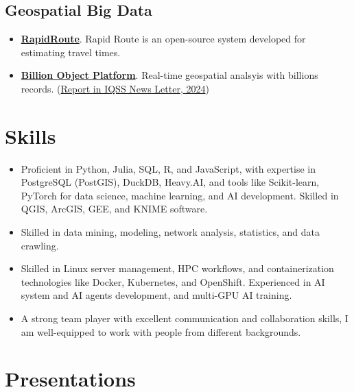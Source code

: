 \documentclass[11pt]{article}
\begin{document}
\subsection*{Geospatial Big Data}

\begin{itemize}
	\item[] \textbf{\href{https://gis.harvard.edu/rapidroute}{RapidRoute}}. Rapid Route is an open-source system developed for estimating travel times.

	\item[] \textbf{\href{https://gis.harvard.edu/billion-object-platform-v20}{Billion Object Platform}}. Real-time geospatial analsyis with billions records. (\href{https://www.iq.harvard.edu/news/cga-geospatial-infrastructure-enhancement}{Report in IQSS News Letter, 2024})
\end{itemize}

\section*{Skills}
\label{skills}

\begin{itemize}
	\item Proficient in Python, Julia, SQL, R, and JavaScript, with expertise in PostgreSQL (PostGIS), DuckDB, Heavy.AI, and tools like Scikit-learn, PyTorch for data science, machine learning, and AI development. Skilled in QGIS, ArcGIS, GEE, and KNIME software.
	\item  Skilled in data mining, modeling, network analysis, statistics, and data crawling.
	\item Skilled in Linux server management, HPC workflows, and containerization technologies like Docker, Kubernetes, and OpenShift. Experienced in AI system and AI agents development, and multi-GPU AI training.
	\item  A strong team player with excellent communication and collaboration skills, I am well-equipped to work with people from different backgrounds.
\end{itemize}

\section*{Presentations}
\label{presentations}
\end{document}
